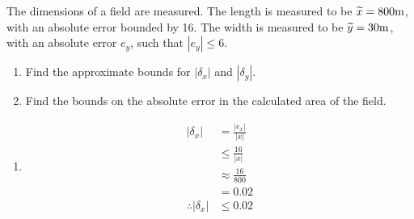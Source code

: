 \documentclass[fleqn, a4paper, 12pt, twoside]{article}
\theoremstyle{definition}
\theoremstyle{theorem}
\renewcommand{\tilde}{\widetilde}
\begin{document}
\begin{question}
	The dimensions of a field are measured.
	The length is measured to be $\tilde{x} = 800 \metre$, with an absolute error bounded by 16.
	The width is measured to be $\tilde{y} = 30 \metre$, with an absolute error $e_y$, such that $|e_y| \le 6$.\\
	\begin{enumerate}
		\item Find the approximate bounds for $|\delta_x|$ and $|\delta_y|$.
		\item Find the bounds on the absolute error in the calculated area of the field.
	\end{enumerate}
\end{question}

\begin{solution}
	\begin{enumerate}[leftmargin=*]
		\item
			\begin{align*}
				|\delta_x|            & = \frac{|e_x|}{|x|}    \\
                                                      & \le \frac{16}{|x|}     \\
                                                      & \approx \frac{16}{800} \\
                                                      & = 0.02                 \\
				\therefore |\delta_x| & \le 0.02
			\end{align*}
		

\end{enumerate}
\end{solution}
\end{document}
